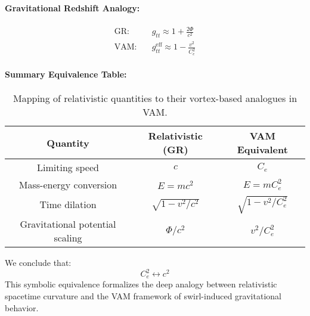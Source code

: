\documentclass[12pt]{article}
\begin{document}
\paragraph{Gravitational Redshift Analogy:}
\begin{align*}
    \text{GR:}\quad & g_{tt} \approx 1 + \frac{2\Phi}{c^2} \\
    \text{VAM:}\quad & g_{tt}^{\text{eff}} \approx 1 - \frac{v^2}{C_e^2}
\end{align*}

\paragraph{Summary Equivalence Table:}
\begin{table}[H]
    \centering
    \renewcommand{\arraystretch}{1.3}
    \begin{tabular}{|c|c|c|}
        \hline
        \textbf{Quantity} & \textbf{Relativistic (GR)} & \textbf{VAM Equivalent} \\
        \hline
        Limiting speed & \( c \) & \( C_e \) \\
        Mass-energy conversion & \( E = mc^2 \) & \( E = m C_e^2 \) \\
        Time dilation & \( \sqrt{1 - v^2/c^2} \) & \( \sqrt{1 - v^2/C_e^2} \) \\
        Gravitational potential scaling & \( \Phi/c^2 \) & \( v^2/C_e^2 \) \\
        \hline
    \end{tabular}
    \caption{Mapping of relativistic quantities to their vortex-based analogues in VAM.}
\end{table}

\noindent
We conclude that:
\[
    \boxed{C_e^2 \longleftrightarrow c^2}
\]
This symbolic equivalence formalizes the deep analogy between relativistic spacetime curvature and the VAM framework of swirl-induced gravitational behavior.



\ifdefined\standalonechapter\else
    
    
    
\end{document}
